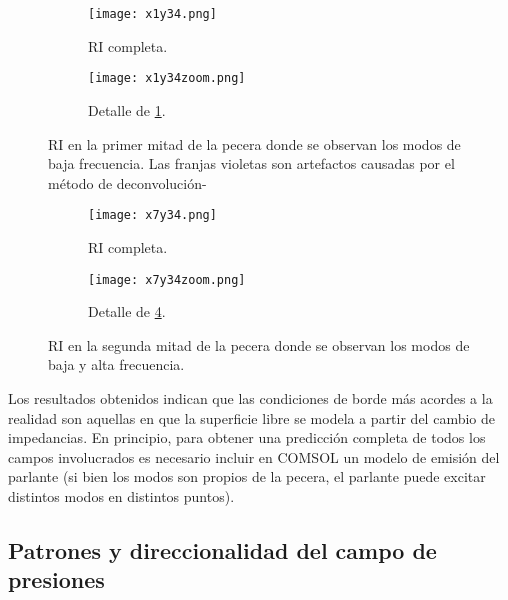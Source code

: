 \begin{figure}[H]
		\begin{subfigure}[b]{\textwidth}
			\centering
			\texttt{[image: x1y34.png]}
			\caption{RI completa.}
			\label{subfig:x1y34}
		\end{subfigure}

		\begin{subfigure}[b]{\textwidth}
			\centering
			\texttt{[image: x1y34zoom.png]}
			\caption{Detalle de \ref{subfig:x1y34}.}
			\label{subfig:x1y34zoom}
		\end{subfigure}
		\caption{RI en la primer mitad de la pecera donde se observan los modos de baja frecuencia. Las franjas violetas son artefactos causadas por el método de deconvolución-}
		\label{fig:modosbajos1}
\end{figure}

\begin{figure}[H]
		\begin{subfigure}[b]{\textwidth}
			\centering
			\texttt{[image: x7y34.png]}
			\caption{RI completa.}
			\label{subfig:x7y34}
		\end{subfigure}

		\begin{subfigure}[b]{\textwidth}
			\centering
			\texttt{[image: x7y34zoom.png]}
			\caption{Detalle de \ref{subfig:x7y34}.}
			\label{subfig:x7y34zoom}
		\end{subfigure}
		\caption{RI en la segunda mitad de la pecera donde se observan los modos de baja y alta frecuencia.}
		\label{fig:modosaltos1}
\end{figure}

Los resultados obtenidos indican que las condiciones de borde más acordes a la realidad son aquellas en que la superficie libre se modela a partir del cambio de impedancias. En principio, para obtener una predicción completa de todos los campos involucrados es necesario incluir en COMSOL un modelo de emisión del parlante (si bien los modos son propios de la pecera, el parlante puede excitar distintos modos en distintos puntos).

\subsection{Patrones y direccionalidad del campo de presiones}
\label{sec:rescompo}

